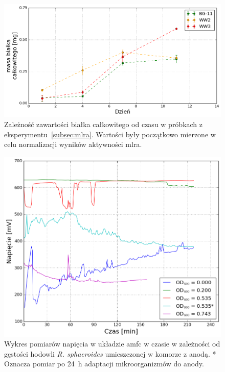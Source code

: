 \vspace{\fill}

\begin{figure}
    \label{fig:6}
    \centering
    \includegraphics[width=12.5cm]{figures/totalprot}
    \caption{
        Zależność zawartości białka całkowitego od czasu w próbkach
        z eksperymentu~\ref{subsec:mlra}. Wartości były początkowo
        mierzone w celu normalizacji wyników aktywności \acrshort{mlra}.
    }
\end{figure}

\begin{figure}
    \label{fig:7}
    \centering
    \includegraphics[width=12.5cm]{figures/voltage1}
    \caption{
        Wykres pomiarów napięcia w układzie \acrshort{amfc}
        w czasie w zależności od gęstości hodowli
        \textit{R. sphaeroides} umieszczonej w komorze z anodą.
        * Oznacza pomiar po 24~h adaptacji mikroorganizmów
        do anody.
    }
\end{figure}

